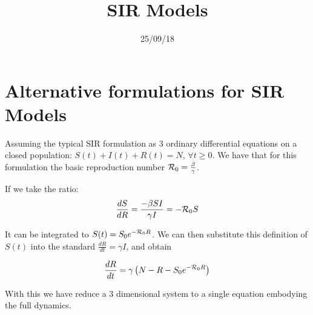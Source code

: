 \documentclass[a4paper,10pt]{article}
\date{25/09/18}
\title{SIR Models}
\begin{document}
\maketitle
 \section*{Alternative formulations for SIR Models}
 
 Assuming the typical SIR formulation as 3 ordinary differential equations on a 
closed population: $S(t)+I(t)+R(t)=N$, $\forall t \geq 0$. We have that for 
this formulation the basic reproduction number ${\cal 
R}_0=\frac{\beta}{\gamma}$.

If we take the ratio:
\begin{equation}
 \frac{dS}{dR} = \frac{-\beta S I}{\gamma I}=-{\cal R}_0 S
\end{equation}

It can be integrated to $S(t)=S_0 e^{-{\cal R}_0 R}$. We can then substitute 
this definition of $S(t)$ into the standard $\frac{dR}{dt}=\gamma I$, and obtain

\begin{equation}
 \frac{dR}{dt}=\gamma\left(N-R-S_0 e^{-{\cal R}_0 R} \right)
\end{equation}

With this we have reduce a 3 dimensional system to a single equation embodying 
the full dynamics.
\end{document}
